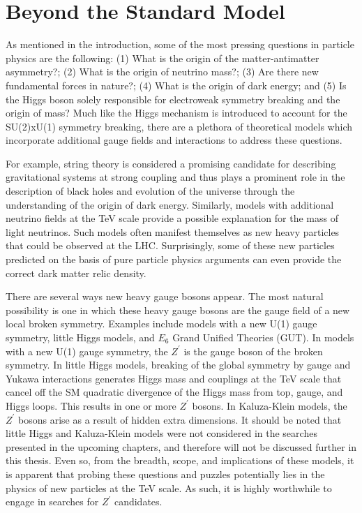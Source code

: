 \section{Beyond the Standard Model}


As mentioned in the introduction, some of the most pressing questions in particle physics are the following: (1) What is the origin of the matter-antimatter asymmetry?; (2) What is the origin of neutrino mass?; (3) Are there new fundamental forces in nature?; (4) What is the origin of dark energy; and (5) Is the Higgs boson solely responsible for electroweak symmetry breaking and the origin of mass? Much like the Higgs mechanism is introduced to account for the SU(2)xU(1) 
symmetry breaking, there are a plethora of theoretical models which incorporate additional gauge fields and interactions to address these questions. 

For example, string theory is considered a promising candidate for describing gravitational systems at strong coupling and thus plays a prominent role in the description of black holes and evolution of the universe through the understanding of the origin of dark energy. Similarly, models with additional neutrino fields at the TeV scale provide a possible explanation for the mass of light neutrinos. Such models often manifest themselves as new heavy particles that could be observed at the LHC. Surprisingly, some of these new particles predicted on the basis of pure particle physics arguments can even provide the correct dark matter relic density. 

There are several ways new heavy gauge bosons appear. The most natural possibility is one in which these heavy gauge bosons are the gauge field of a new local broken symmetry. Examples include models with a new U(1) gauge symmetry, little Higgs models, and $E_6$ Grand Unified Theories (GUT). In models with a new U(1) gauge symmetry, the $Z^\prime$ is the gauge boson of the broken symmetry. In little Higgs models, breaking of the global symmetry by gauge and Yukawa interactions generates Higgs mass and couplings at the TeV scale that cancel off the SM quadratic divergence of the Higgs mass from top, gauge, and Higgs loops. This results in one or more $Z^\prime$ bosons. In Kaluza-Klein models, the $Z^\prime$ bosons arise as a result of hidden extra dimensions.  It should be noted that little Higgs and Kaluza-Klein models were not considered in the searches presented in the upcoming chapters, and therefore will not be discussed further in this thesis. Even so, from the breadth, scope, and implications of these models, it is apparent that probing these questions and puzzles potentially lies in the physics of new particles at the TeV scale. As such, it is highly worthwhile to engage in searches for $Z^\prime$ candidates.


